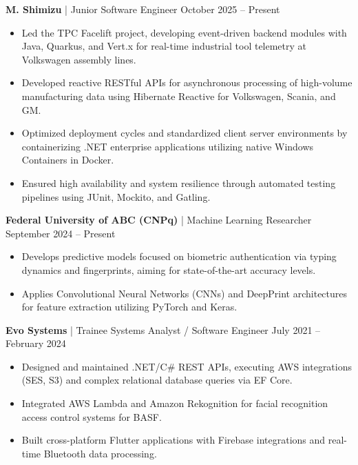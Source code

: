 \textbf{M. Shimizu} | Junior Software Engineer \hfill October 2025 -- Present \\ %
\vspace{-0.4cm}
\begin{itemize}[leftmargin=*, noitemsep]
    \item Led the TPC Facelift project, developing event-driven backend modules with Java, Quarkus, and Vert.x for real-time industrial tool telemetry at Volkswagen assembly lines. %
    \item Developed reactive RESTful APIs for asynchronous processing of high-volume manufacturing data using Hibernate Reactive for Volkswagen, Scania, and GM. %
    \item Optimized deployment cycles and standardized client server environments by containerizing .NET enterprise applications utilizing native Windows Containers in Docker. %
    \item Ensured high availability and system resilience through automated testing pipelines using JUnit, Mockito, and Gatling. %
\end{itemize}

\textbf{Federal University of ABC (CNPq)} | Machine Learning Researcher \hfill September 2024 -- Present \\ %
\vspace{-0.4cm}
\begin{itemize}[leftmargin=*, noitemsep]
    \item Develops predictive models focused on biometric authentication via typing dynamics and fingerprints, aiming for state-of-the-art accuracy levels. %
    \item Applies Convolutional Neural Networks (CNNs) and DeepPrint architectures for feature extraction utilizing PyTorch and Keras. %
\end{itemize}

\textbf{Evo Systems} | Trainee Systems Analyst / Software Engineer \hfill July 2021 -- February 2024 \\ %
\vspace{-0.4cm}
\begin{itemize}[leftmargin=*, noitemsep]
    \item Designed and maintained .NET/C\# REST APIs, executing AWS integrations (SES, S3) and complex relational database queries via EF Core. %
    \item Integrated AWS Lambda and Amazon Rekognition for facial recognition access control systems for BASF. %
    \item Built cross-platform Flutter applications with Firebase integrations and real-time Bluetooth data processing. %
\end{itemize}
